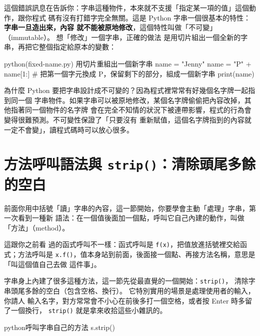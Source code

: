 這個錯誤訊息在告訴你：字串這種物件，本來就不支援「指定某一項的值」這個動作，跟你程式
碼有沒有打錯字完全無關。這是 Python 字串一個很基本的特性：\textbf{字串一旦造出來，內容
就不能被原地修改}，這個特性叫做「不可變」（immutable）。
想「修改」一個字串，正確的做法
是用切片組出一個全新的字串，再把它整個指定給原本的變數：

\begin{example}{python}{(fixed-name.py) 用切片重組出一個新字串}
name = "Jenny"
name = "P" + name[1:]   # 把第一個字元換成 P，保留剩下的部分，組成一個新字串
print(name)
\end{example}


為什麼 Python 要把字串設計成不可變的？因為程式裡常常有好幾個名字牌一起指到同一個
字串物件。如果字串可以被原地修改，某個名字牌偷偷把內容改掉，其他指著同一個物件的名字牌
會在完全不知情的狀況下被連帶影響，程式的行為會變得很難預測。不可變性保證了「只要沒有
重新賦值，這個名字牌指到的內容就一定不會變」，讀程式碼時可以放心很多。


\section{方法呼叫語法與 \texttt{strip()}：清除頭尾多餘的空白}
\label{sec:strip-method}

前面你用中括號「讀」字串的內容，這一節開始，你要學會主動「處理」字串，第一次看到一種新
語法：在一個值後面加一個點，呼叫它自己內建的動作，叫做「方法」（method）。

這跟你之前看
過的函式呼叫不一樣：函式呼叫是 \texttt{f(x)}，把值放進括號裡交給函式；方法呼叫是
\texttt{x.f()}，值本身站到前面，後面接一個點、再接方法名稱，意思是「叫這個值自己去做
這件事」。

字串身上內建了很多這種方法，這一節先從最直覺的一個開始：\texttt{strip()}，
清除字串頭尾多餘的空白（包含空格、換行）。
它特別實用的場景是處理使用者的輸入，你請人
輸入名字，對方常常會不小心在前後多打一個空格，或者按 Enter 時多留了一個換行，
\texttt{strip()} 就是拿來收拾這些小雜訊的。

\begin{code}{python}{呼叫字串自己的方法}
s.strip()
\end{code}

